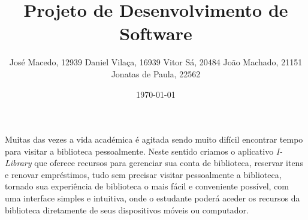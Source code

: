 \documentclass[a4paper,12pt,twoside]{book}
\title{Projeto de Desenvolvimento de Software}
\author{José Macedo, 12939 \AND Daniel Vilaça, 16939 \AND  Vitor Sá, 20484 \AND João Machado, 21151 \AND Jonatas de Paula, 22562}
\date{\today}
\begin{document}
%


\frontmatter
\maketitle  %

\begin{resumo}
    Muitas das vezes a vida académica é agitada sendo muito difícil encontrar tempo para visitar a biblioteca pessoalmente. Neste sentido criamos o aplicativo \textit{I-Library} que  oferece recursos para gerenciar sua conta de biblioteca, reservar itens e renovar empréstimos, tudo sem precisar visitar pessoalmente a biblioteca, tornado sua experiência de biblioteca o mais fácil e conveniente possível, com uma interface simples e intuitiva, onde o estudante poderá aceder os recursos da biblioteca diretamente de seus dispositivos móveis ou computador.
\end{resumo}

\tableofcontents

\listoffigures
{}

\printglossary[type=\acronymtype,title={Siglas \& Acrónimos},toctitle={Siglas \& Acrónimos}]

\printglossary[title={Indice de Termos},toctitle={Indice de Termos}]


%

\mainmatter










\end{document}

